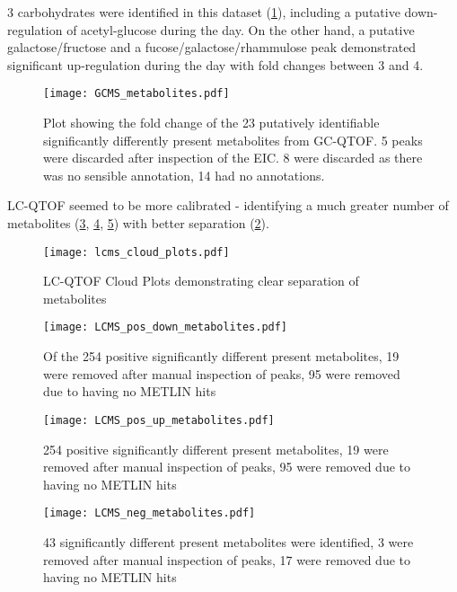 3 carbohydrates were identified in this dataset (\cref{fig:gcms_metabolites}), including 
a putative down-regulation of acetyl-glucose during the day.
On the other hand, a putative galactose/fructose and a fucose/galactose/rhammulose
peak demonstrated significant up-regulation during the day with fold changes
between 3 and 4.

\begin{figure}
    \centering
    \texttt{[image: GCMS\_metabolites.pdf]}
    \caption[Plot of identifiable GC-QTOF metabolites]{Plot showing the
        fold change of the 23 putatively identifiable significantly
        differently present metabolites from GC-QTOF. 5 peaks
        were discarded after inspection of the EIC. 8 were discarded
    as there was no sensible annotation, 14 had no annotations.}
    \label{fig:gcms_metabolites}
\end{figure}

LC-QTOF seemed to be more calibrated - identifying a much greater number of metabolites
(\cref{fig:posqtofdown}, \cref{fig:posqtofup}, \cref{fig:negqtof})
with better separation (\cref{fig:lcms_clouds}).

\begin{figure}
    \centering
    \texttt{[image: lcms\_cloud\_plots.pdf]}
    \caption[LC-QTOF cloud plots]{LC-QTOF Cloud Plots demonstrating
    clear separation of metabolites}
    \label{fig:lcms_clouds}
\end{figure}


\begin{figure}
    \centering
    \texttt{[image: LCMS\_pos\_down\_metabolites.pdf]}
    \caption{Of the 254 positive significantly different present metabolites,
        19 were removed after manual inspection of peaks, 95 were removed due
    to having no METLIN hits}
    \label{fig:posqtofdown}
\end{figure}


\begin{figure}
    \centering
    \texttt{[image: LCMS\_pos\_up\_metabolites.pdf]}
    \caption{254 positive significantly different present metabolites,
        19 were removed after manual inspection of peaks, 95 were removed due
    to having no METLIN hits}
    \label{fig:posqtofup}
\end{figure}


\begin{figure}
    \centering
    \texttt{[image: LCMS\_neg\_metabolites.pdf]}
    \caption{43 significantly different present metabolites were identified,
        3 were removed after manual inspection of peaks, 17 were removed due
    to having no METLIN hits}
    \label{fig:negqtof}
\end{figure}


